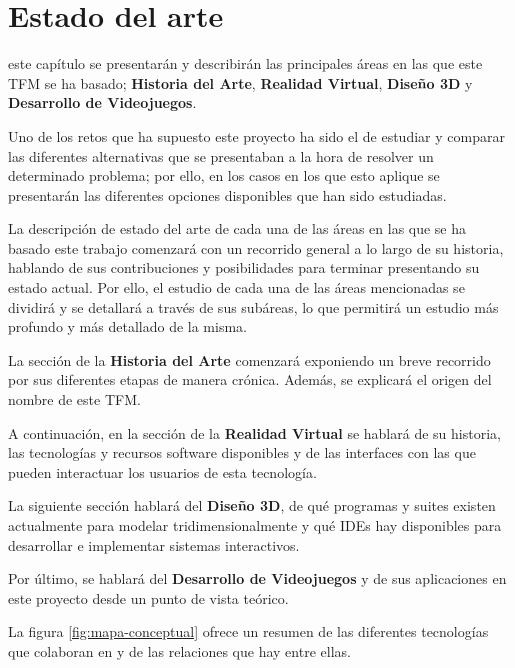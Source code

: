 \chapter{Estado del arte}
\label{chap:estado_arte}

 este capítulo se presentarán y describirán las principales áreas en las que este \acs{TFM} se ha basado; \textbf{Historia del Arte}, \textbf{Realidad Virtual}, \textbf{Diseño 3D} y \textbf{Desarrollo de Videojuegos}.

Uno de los retos que ha supuesto este proyecto ha sido el de estudiar y comparar las diferentes alternativas que se presentaban a la hora de resolver un determinado problema; por ello, en los casos en los que esto aplique se presentarán las diferentes opciones disponibles que han sido estudiadas.

La descripción de estado del arte de cada una de las áreas en las que se ha basado este trabajo comenzará con un recorrido general a lo largo de su historia, hablando de sus contribuciones y posibilidades para terminar presentando su estado actual. Por ello, el estudio de cada una de las áreas mencionadas se dividirá y se detallará a través de sus subáreas, lo que permitirá un estudio más profundo y más detallado de la misma.

La sección de la \textbf{Historia del Arte} comenzará exponiendo un breve recorrido por sus diferentes etapas de manera crónica. Además, se explicará el origen del nombre de este \acs{TFM}.

A continuación, en la sección de la \textbf{Realidad Virtual} se hablará de su historia, las tecnologías y recursos software disponibles y de las interfaces con las que pueden interactuar los usuarios de esta tecnología.

La siguiente sección hablará del \textbf{Diseño 3D}, de qué programas y suites existen actualmente para modelar tridimensionalmente y qué \acs{IDE}s hay disponibles para desarrollar e implementar sistemas interactivos.

Por último, se hablará del \textbf{Desarrollo de Videojuegos} y de sus aplicaciones en este proyecto desde un punto de vista teórico.

La figura \ref{fig:mapa-conceptual} ofrece un resumen de las diferentes tecnologías que colaboran en \MineRVa y de las relaciones que hay entre ellas.

\vspace{0.4cm}

